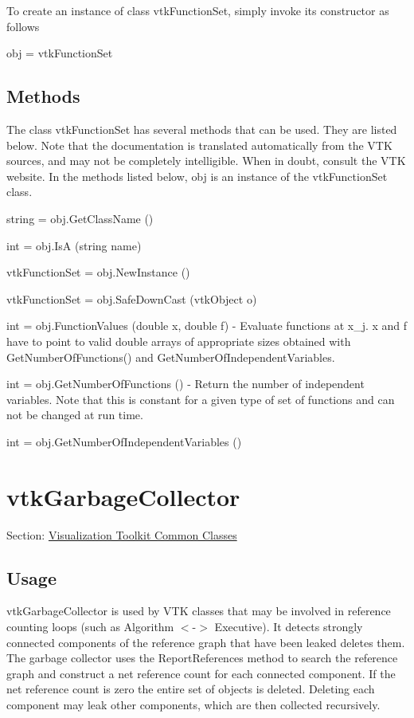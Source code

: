 To create an instance of class vtk\-Function\-Set, simply invoke its constructor as follows \begin{DoxyVerb}  obj = vtkFunctionSet
\end{DoxyVerb}
 \hypertarget{vtkwidgets_vtkxyplotwidget_Methods}{}\subsection{Methods}\label{vtkwidgets_vtkxyplotwidget_Methods}
The class vtk\-Function\-Set has several methods that can be used. They are listed below. Note that the documentation is translated automatically from the V\-T\-K sources, and may not be completely intelligible. When in doubt, consult the V\-T\-K website. In the methods listed below, {\ttfamily obj} is an instance of the vtk\-Function\-Set class. 
\begin{DoxyItemize}
\item {\ttfamily string = obj.\-Get\-Class\-Name ()}  
\item {\ttfamily int = obj.\-Is\-A (string name)}  
\item {\ttfamily vtk\-Function\-Set = obj.\-New\-Instance ()}  
\item {\ttfamily vtk\-Function\-Set = obj.\-Safe\-Down\-Cast (vtk\-Object o)}  
\item {\ttfamily int = obj.\-Function\-Values (double x, double f)} -\/ Evaluate functions at x\-\_\-j. x and f have to point to valid double arrays of appropriate sizes obtained with Get\-Number\-Of\-Functions() and Get\-Number\-Of\-Independent\-Variables.  
\item {\ttfamily int = obj.\-Get\-Number\-Of\-Functions ()} -\/ Return the number of independent variables. Note that this is constant for a given type of set of functions and can not be changed at run time.  
\item {\ttfamily int = obj.\-Get\-Number\-Of\-Independent\-Variables ()}  
\end{DoxyItemize}\hypertarget{vtkcommon_vtkgarbagecollector}{}\section{vtk\-Garbage\-Collector}\label{vtkcommon_vtkgarbagecollector}
Section\-: \hyperlink{sec_vtkcommon}{Visualization Toolkit Common Classes} \hypertarget{vtkwidgets_vtkxyplotwidget_Usage}{}\subsection{Usage}\label{vtkwidgets_vtkxyplotwidget_Usage}
vtk\-Garbage\-Collector is used by V\-T\-K classes that may be involved in reference counting loops (such as Algorithm $<$-\/$>$ Executive). It detects strongly connected components of the reference graph that have been leaked deletes them. The garbage collector uses the Report\-References method to search the reference graph and construct a net reference count for each connected component. If the net reference count is zero the entire set of objects is deleted. Deleting each component may leak other components, which are then collected recursively.

